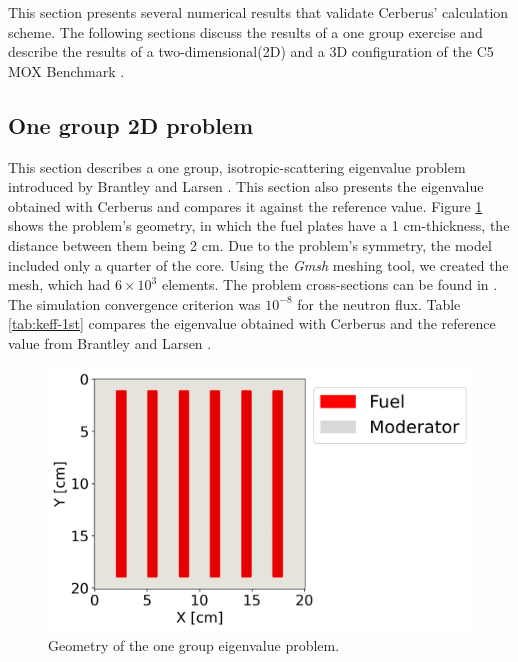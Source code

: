 \documentclass{anstrans}
\begin{document}
This section presents several numerical results that validate Cerberus' calculation scheme.
The following sections discuss the results of a one group exercise and describe the results of a two-dimensional(2D) and a 3D configuration of the C5 MOX Benchmark \cite{cavarec_benchmark_1994}.

\subsection{One group 2D problem}

This section describes a one group, isotropic-scattering eigenvalue problem introduced by Brantley and Larsen \cite{brantley_simplifiedP3_2000}.
This section also presents the eigenvalue obtained with Cerberus and compares it against the reference value.
Figure \ref{fig:2D} shows the problem's geometry, in which the fuel plates have a 1 cm-thickness, the distance between them being 2 cm.
Due to the problem's symmetry, the model included only a quarter of the core.
Using the \textit{Gmsh} \cite{geuzaine_gmsh_2009} meshing tool, we created the mesh, which had $6 \times 10^{3}$ elements.
The problem cross-sections can be found in \cite{brantley_simplifiedP3_2000}.
The simulation convergence criterion was $10^{-8}$ for the neutron flux.
Table \ref{tab:keff-1st} compares the eigenvalue obtained with Cerberus and the reference value from Brantley and Larsen \cite{brantley_simplifiedP3_2000}.

\begin{figure}[htbp!] %
    \centering
    \includegraphics[width=0.65\linewidth]{figures/mesh2.png}
    \hfill
    \caption{Geometry of the one group eigenvalue problem.}
    \label{fig:2D}
\end{figure}

\end{document}
